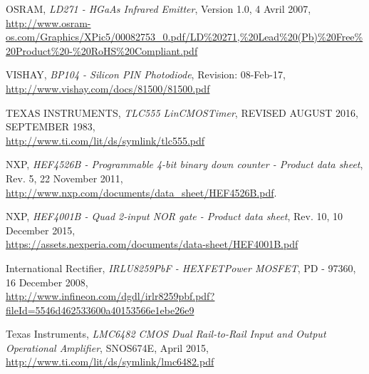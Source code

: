 \documentclass[french]{layout/Report}
\begin{document}
\begin{thebibliography}{9}

	OSRAM,
	\textit{LD271 - HGaAs Infrared Emitter},
	Version 1.0,
	4 Avril 2007,
	\url{http://www.osram-os.com/Graphics/XPic5/00082753_0.pdf/LD%20271,%20Lead%20(Pb)%20Free%20Product%20-%20RoHS%20Compliant.pdf}

		VISHAY,
		\textit{BP104 - Silicon PIN Photodiode},
		Revision: 08-Feb-17,\\
		\url{http://www.vishay.com/docs/81500/81500.pdf}

		TEXAS INSTRUMENTS,
		\textit{TLC555 LinCMOS\texttrademark Timer},
		REVISED AUGUST 2016,
		SEPTEMBER 1983,\\
		\url{http://www.ti.com/lit/ds/symlink/tlc555.pdf}

		NXP,
		\textit{HEF4526B - Programmable 4-bit binary down counter - Product data sheet},
		Rev. 5,
		22 November 2011,\\
		\url{http://www.nxp.com/documents/data_sheet/HEF4526B.pdf}.

        NXP,
        \textit{HEF4001B - Quad 2-input NOR gate - Product data sheet},
        Rev. 10,
        10 December 2015,\\
        \url{https://assets.nexperia.com/documents/data-sheet/HEF4001B.pdf}

        International Rectifier,
        \textit{IRLU8259PbF - HEXFET\textregistered Power MOSFET},
        PD - 97360,
        16 December 2008,\\
        \url{http://www.infineon.com/dgdl/irlr8259pbf.pdf?fileId=5546d462533600a40153566e1ebe26e9}

		Texas Instruments,
		\textit{LMC6482 CMOS Dual Rail-to-Rail Input and Output Operational Amplifier},
		SNOS674E,
		April 2015,\\
		\url{http://www.ti.com/lit/ds/symlink/lmc6482.pdf}

\end{thebibliography}


\end{document}
